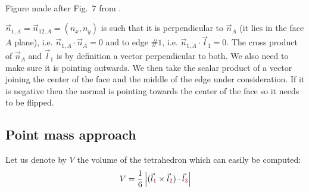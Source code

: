\begin{center}
\\
{\captionfont Figure made after Fig.~7 from \textcite{wesc97}.}
\end{center}



$\vec{n}_{1,A}=\vec{n}_{12,A}=(n_x,n_y)$ is such that it is perpendicular to $\vec{n}_A$ 
(it lies in the face $A$ plane), i.e. $\vec{n}_{1,A}\cdot \vec{n}_A=0$ and to edge $\#1$, i.e. 
$\vec{n}_{1,A}\cdot \vec{l}_{1}=0$. The cross product of $\vec{n}_A$ and $\vec{l}_{1}$ is 
by definition a vector perpendicular to both.
We also need to make sure it is pointing outwards. We then take the scalar product of a 
vector joining the center of the face and the middle of the 
edge under consideration. If it is negative then the normal is pointing towards the center of the 
face so it needs to be flipped.




\subsection*{Point mass approach}

Let us denote by $V$ the volume of the tetrahedron which 
can easily be computed:
\begin{equation}
V=\frac16 \left| (\vec{l}_{\color{purple}1} \times \vec{l}_{\color{purple}2}) \cdot \vec{l}_{\color{purple}3}\right|
\label{eq:tet:vol}
\end{equation}

